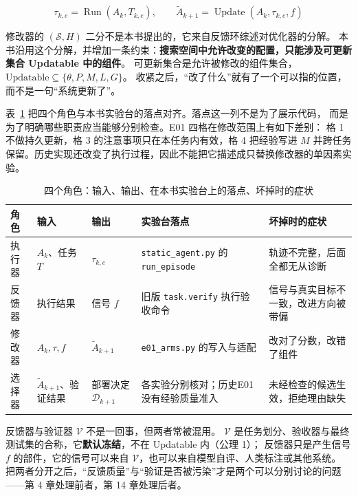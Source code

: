 \begin{equation}
\tau_{k,e}=\operatorname{Run}(A_k,T_{k,e}),\qquad
\widetilde A_{k+1}=\operatorname{Update}(A_k,\tau_{k,e},f)
\label{eq:update}
\end{equation}

修改器的 $(\mathcal S,H)$ 二分不是本书提出的，它来自反馈环综述对优化器的分解\cite{self-evolving-comprehensive-2508}。
本书沿用这个分解，并增加一条约束：\textbf{搜索空间中允许改变的配置，只能涉及可更新集合 Updatable 中的组件}。
可更新集合是允许被修改的组件集合，$\mathrm{Updatable}\subseteq\{\theta,P,M,L,G\}$。
收紧之后，“改了什么”就有了一个可以指的位置，而不是一句“系统更新了”。

表~\ref{tab:roles} 把四个角色与本书实验台的落点对齐。落点这一列不是为了展示代码，
而是为了明确哪些职责应当能够分别检查。E01 四格在修改范围上有如下差别：
格 1 不做持久更新，格 3 的注意事项只在本任务内有效，格 4 把经验写进 $M$ 并跨任务保留。历史实现还改变了执行过程，因此不能把它描述成只替换修改器的单因素实验。

\begin{table}[htbp]
\centering
\caption{四个角色：输入、输出、在本书实验台上的落点、坏掉时的症状}
\label{tab:roles}
\begin{tabular}{>{\raggedright\arraybackslash}p{1.5cm}>{\raggedright\arraybackslash}p{2.4cm}>{\raggedright\arraybackslash}p{2.4cm}>{\raggedright\arraybackslash}p{3.6cm}>{\raggedright\arraybackslash}p{3.1cm}}
\toprule
角色 & 输入 & 输出 & 实验台落点 & 坏掉时的症状 \\
\midrule
执行器 & $A_k$、任务 $T$ & $\tau_{k,e}$ & \texttt{static\_agent.py} 的 \texttt{run\_episode} & 轨迹不完整，后面全都无从诊断 \\
反馈器 & 执行结果 & 信号 $f$ & 旧版 \texttt{task.verify} 执行验收命令 & 信号与真实目标不一致，改进方向被带偏 \\
修改器 & $A_k,\tau,f$ & $\widetilde A_{k+1}$ & \texttt{e01\_arms.py} 的写入与适配 & 改对了分数，改错了组件 \\
选择器 & $\widetilde A_{k+1}$、验证结果 & 部署决定 $\mathcal D_{k+1}$ & 各实验分别核对；历史E01没有经验质量准入 & 未经检查的候选生效，拒绝理由缺失 \\
\bottomrule
\end{tabular}
\end{table}

反馈器与验证器 $\mathcal V$ 不是一回事，但两者常被混用。
$\mathcal V$ 是任务划分、验收器与最终测试集的合称，它\textbf{默认冻结}，不在 Updatable 内（公理 1）；
反馈器只是产生信号 $f$ 的部件，它的信号可以来自 $\mathcal V$，也可以来自模型自评、人类标注或其他系统。
把两者分开之后，“反馈质量”与“验证是否被污染”才是两个可以分别讨论的问题——第 4 章处理前者，第 14 章处理后者。

